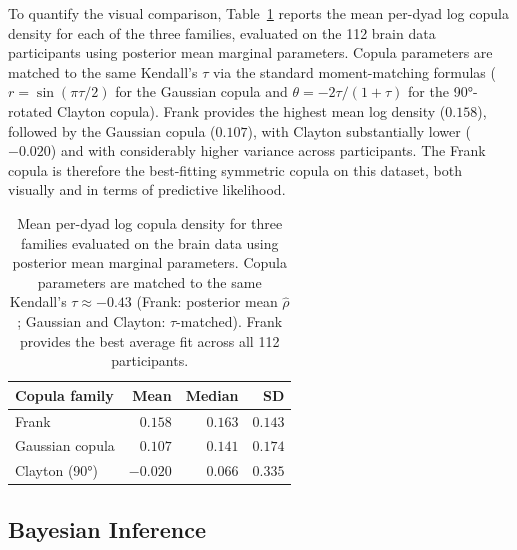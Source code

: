 \documentclass[12pt]{article}
\begin{document}
To quantify the visual comparison, Table~\ref{tab:copula_comparison} reports
the mean per-dyad log copula density for each of the three families, evaluated
on the 112 brain data participants using posterior mean marginal parameters.
Copula parameters are matched to the same Kendall's $\tau$ via the standard
moment-matching formulas ($r = \sin(\pi\tau/2)$ for the Gaussian copula and
$\theta = -2\tau/(1+\tau)$ for the 90°-rotated Clayton copula).  Frank
provides the highest mean log density ($0.158$), followed by the Gaussian
copula ($0.107$), with Clayton substantially lower ($-0.020$) and with
considerably higher variance across participants.  The Frank copula is
therefore the best-fitting symmetric copula on this dataset, both visually
and in terms of predictive likelihood.

\begin{table}[htb]
\caption{Mean per-dyad log copula density for three families evaluated on
  the brain data using posterior mean marginal parameters.  Copula parameters
  are matched to the same Kendall's $\tau \approx -0.43$ (Frank: posterior
  mean $\hat{\rho}$; Gaussian and Clayton: $\tau$-matched).  Frank provides
  the best average fit across all 112 participants.}
\label{tab:copula_comparison}
\begin{center}
\begin{tabular}{lrrr}
\toprule
Copula family & Mean & Median & SD \\
\midrule
Frank & $0.158$ & $0.163$ & $0.143$ \\
Gaussian copula & $0.107$ & $0.141$ & $0.174$ \\
Clayton (90°) & $-0.020$ & $0.066$ & $0.335$ \\
\bottomrule
\end{tabular}
\end{center}
\end{table}

\subsection{Bayesian Inference}
\end{document}
